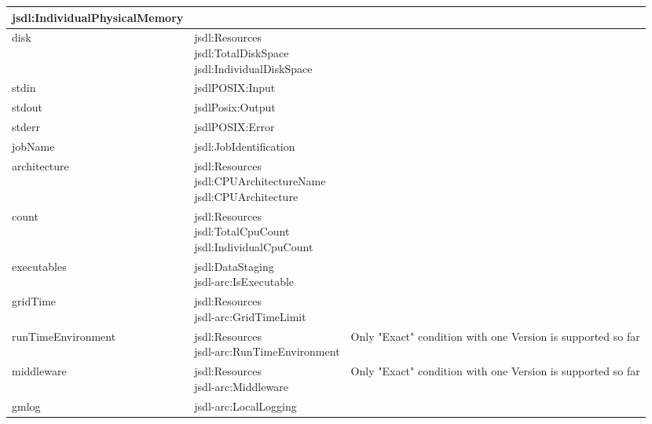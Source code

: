 \begin{longtable}{|l|l|p{5cm}|}
{    \hspace*{0.5cm}jsdl:IndividualPhysicalMemory} & \\ \hline
disk & \parbox[t]{5.5cm}{
    jsdl:Resources \\
    \hspace*{0.5cm}jsdl:TotalDiskSpace \\
    \hspace*{0.5cm}jsdl:IndividualDiskSpace} & \\ \hline
stdin & jsdlPOSIX:Input & \\ \hline
stdout & jsdlPosix:Output & \\ \hline
stderr & jsdlPOSIX:Error & \\ \hline
jobName & jsdl:JobIdentification & \\ \hline
architecture & \parbox[t]{5.5cm}{
    jsdl:Resources \\
    \hspace*{0.5cm}jsdl:CPUArchitectureName \\
    \hspace*{1cm}jsdl:CPUArchitecture} & \\ \hline
count &  \parbox[t]{5.5cm}{
    jsdl:Resources \\
    \hspace*{0.5cm}jsdl:TotalCpuCount \\
    \hspace*{0.5cm}jsdl:IndividualCpuCount} & \\ \hline
executables &  \parbox[t]{5.5cm}{
    jsdl:DataStaging \\
    \hspace*{0.5cm} jsdl-arc:IsExecutable} & \\ \hline
gridTime &  \parbox[t]{5.5cm}{
    jsdl:Resources \\
    \hspace*{0.5cm} jsdl-arc:GridTimeLimit} & \\ \hline
runTimeEnvironment & \parbox[t]{5.5cm}{
    jsdl:Resources \\
    \hspace*{0.5cm}jsdl-arc:RunTimeEnvironment} &
    Only "Exact" condition with one Version is supported so far \\ \hline
middleware &  \parbox[t]{5.5cm}{
    jsdl:Resources \\
    \hspace*{0.5cm}jsdl-arc:Middleware} &
    Only "Exact" condition with one Version is supported so far \\ \hline
gmlog &  \parbox[t]{5.5cm}{
    jsdl-arc:LocalLogging \\
}
\end{longtable}
